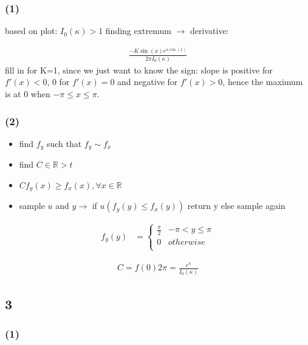 \subsubsection*{ (1) }

based on plot: $I_{0}\left(\kappa \right)> 1$
finding extremum $\rightarrow $ derivative:

\begin{align*}
\frac{-K \sin \left(x\right)e^{{\kappa \cos \left(x\right)}}}{2\pi I_{0}\left(\kappa \right)}
\end{align*}
fill in for K=1, since we just want to know the sign: slope is positive for $f'(x)<0$,
0 for $f'(x)=0$ and negative for $f'(x)>0$, hence the maximum is at 0 when $-\pi \le x\le \pi $.

\subsubsection*{ (2) }

\begin{itemize}
\item  find $f_{y}$ such that $f_{y}\sim f_{x}$
\item  find $C\in \mathbb{R}> t$
\item  $C f_{y}\left(x\right)\ge f_{x}\left(x\right), \forall x\in \mathbb{R}$
\item  sample $u$ and $y\rightarrow $ if $u\left(f_{y}\left(y\right)\le f_{x}\left(y\right)\right)$ return y else sample again
\end{itemize}

\begin{align*}
f_{y}\left(y\right)&=\begin{cases}
\frac{\pi }{2}&-\pi < y\le \pi \\
0&otherwise\\
\end{cases}
\end{align*}

\begin{align*}
C = f(0) 2 \pi = \frac{e^{\kappa}}{I_0 (\kappa)}
\end{align*}

\subsection*{ 3 }

\subsubsection*{ (1) }

